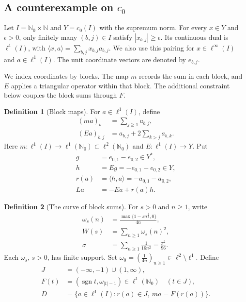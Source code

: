 \documentclass[11pt]{article}
\newcommand{\N}{\mathbb N}
\newcommand{\Nzero}{\mathbb N_0}
\newcommand{\sgn}{\operatorname{sgn}}
\newcommand{\pair}[2]{\langle #1,#2\rangle}
\theoremstyle{definition}
\newtheorem{definition}{Definition}
\theoremstyle{remark}
\begin{document}
\subsection{A counterexample on $c_0$}

Let $I=\Nzero\times\N$ and $Y=c_0(I)$ with the supremum norm. For every $x\in Y$ and $\epsilon>0$, only finitely many $(b,j)\in I$ satisfy $|x_{b,j}|\ge\epsilon$. Its continuous dual is $\ell^1(I)$, with $\pair{x}{a}=\sum_{b,j}x_{b,j}a_{b,j}$. We also use this pairing for $x\in\ell^\infty(I)$ and $a\in\ell^1(I)$. The unit coordinate vectors are denoted by $e_{b,j}$.

We index coordinates by blocks. The map $m$ records the sum in each block, and $E$ applies a triangular operator within that block. The additional constraint below couples the block sums through $F$.
\begin{definition}[Block maps]
For $a\in\ell^1(I)$, define
\begin{equation}
\begin{aligned}
(ma)_b&=\sum_{j\ge1}a_{b,j},\\
(Ea)_{b,j}&=a_{b,j}+2\sum_{k>j}a_{b,k}.
\end{aligned}
\label{eq:D4}
\end{equation}
Here $m:\ell^1(I)\to\ell^1(\Nzero)\subset\ell^2(\Nzero)$ and $E:\ell^1(I)\to Y$. Put
\begin{equation}
\begin{aligned}
g&=e_{0,1}-e_{0,2}\in Y^*,\\
h&=Eg=-e_{0,1}-e_{0,2}\in Y,\\
r(a)&=\pair{h}{a}=-a_{0,1}-a_{0,2},\\
La&=-Ea+r(a)h.
\end{aligned}
\label{eq:D5}
\end{equation}
\end{definition}

\begin{definition}[The curve of block sums]
For $s>0$ and $n\ge1$, write
\begin{equation}
\begin{aligned}
\omega_s(n)&=\frac{\max\{1-sn^{\frac{1}{4}},0\}}{4n},\\
W(s)&=\sum_{n\ge1}\omega_s(n)^2,\\
\sigma&=\sum_{n\ge1}\frac1{16n^2}=\frac{\pi^2}{96}.
\end{aligned}
\label{eq:D6}
\end{equation}
Each $\omega_s$, $s>0$, has finite support. Set $\omega_0=(\frac{1}{4n})_{n\ge1}\in\ell^2\setminus\ell^1$. Define
\begin{equation}
\begin{aligned}
J&=(-\infty,-1)\cup(1,\infty),\\
F(t)&=(\sgn t,\omega_{|t|-1})\in\ell^1(\Nzero)\quad(t\in J),\\
D&=\{a\in\ell^1(I):r(a)\in J,\ ma=F(r(a))\}.
\end{aligned}
\label{eq:D7}
\end{equation}

\end{definition}
\end{document}
